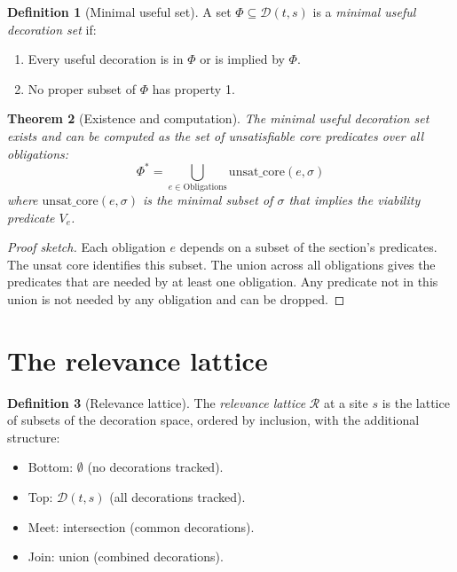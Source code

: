 \documentclass[11pt]{report}
\theoremstyle{definition}
\newtheorem{definition}{Definition}[section]
\theoremstyle{plain}
\newtheorem{theorem}[definition]{Theorem}
\begin{document}
\begin{definition}[Minimal useful set]
A set $\Phi \subseteq \mathcal{D}(t, s)$ is a \emph{minimal useful
decoration set} if:
\begin{enumerate}[nosep]
  \item Every useful decoration is in $\Phi$ or is implied by $\Phi$.
  \item No proper subset of $\Phi$ has property 1.
\end{enumerate}
\end{definition}

\begin{theorem}[Existence and computation]
The minimal useful decoration set exists and can be computed as the set of
unsatisfiable core predicates over all obligations:
\[
  \Phi^* = \bigcup_{e \in \mathrm{Obligations}} \mathrm{unsat\_core}(e, \sigma)
\]
where $\mathrm{unsat\_core}(e, \sigma)$ is the minimal subset of $\sigma$
that implies the viability predicate $V_e$.
\end{theorem}

\begin{proof}[Proof sketch]
Each obligation $e$ depends on a subset of the section's predicates. The
unsat core identifies this subset. The union across all obligations gives the
predicates that are needed by at least one obligation. Any predicate not in
this union is not needed by any obligation and can be dropped.
\end{proof}

\section{The relevance lattice}

\begin{definition}[Relevance lattice]
The \emph{relevance lattice} $\mathcal{R}$ at a site $s$ is the lattice of
subsets of the decoration space, ordered by inclusion, with the additional
structure:
\begin{itemize}[nosep]
  \item Bottom: $\emptyset$ (no decorations tracked).
  \item Top: $\mathcal{D}(t, s)$ (all decorations tracked).
  \item Meet: intersection (common decorations).
  \item Join: union (combined decorations).
\end{itemize}
\end{definition}
\end{document}
